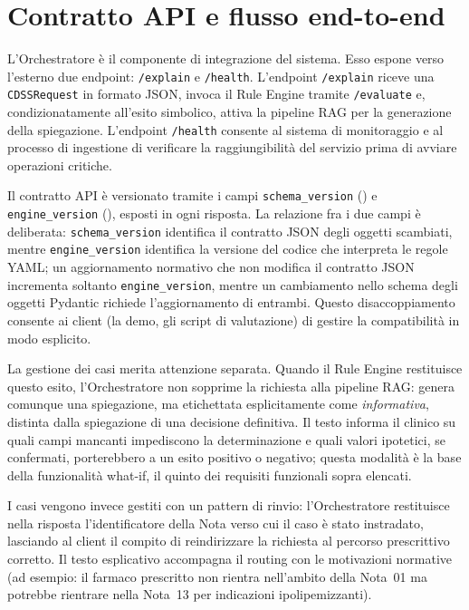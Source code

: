 \section{Contratto API e flusso end-to-end}
\label{sec:orchestrazione}

L'Orchestratore è il componente di integrazione del sistema.
Esso espone verso l'esterno due endpoint: \texttt{/explain} e \texttt{/health}.
L'endpoint \texttt{/explain} riceve una \texttt{CDSSRequest} in formato JSON,
invoca il Rule Engine tramite \texttt{/evaluate} e, condizionatamente
all'esito simbolico, attiva la pipeline RAG per la generazione della
spiegazione.
L'endpoint \texttt{/health} consente al sistema di monitoraggio e al
processo di ingestione di verificare la raggiungibilità del servizio
prima di avviare operazioni critiche.

Il contratto API è versionato tramite i campi \texttt{schema\_version}
(\schemaversion) e \texttt{engine\_version} (\engineversion), esposti
in ogni risposta.
La relazione fra i due campi è deliberata: \texttt{schema\_version}
identifica il contratto JSON degli oggetti scambiati, mentre
\texttt{engine\_version} identifica la versione del codice che interpreta
le regole YAML; un aggiornamento normativo che non modifica il contratto
JSON incrementa soltanto \texttt{engine\_version}, mentre un cambiamento
nello schema degli oggetti Pydantic richiede l'aggiornamento di entrambi.
Questo disaccoppiamento consente ai client (la demo, gli script di valutazione)
di gestire la compatibilità in modo esplicito.

La gestione dei casi  merita attenzione separata.
Quando il Rule Engine restituisce questo esito, l'Orchestratore non sopprime
la richiesta alla pipeline RAG: genera comunque una spiegazione, ma
etichettata esplicitamente come \emph{informativa}, distinta dalla spiegazione
di una decisione definitiva.
Il testo informa il clinico su quali campi mancanti impediscono la
determinazione e quali valori ipotetici, se confermati, porterebbero
a un esito positivo o negativo; questa modalità è la base della funzionalità
what-if, il quinto dei requisiti funzionali sopra elencati.

I casi  vengono invece gestiti con un pattern di rinvio:
l'Orchestratore restituisce nella risposta l'identificatore della Nota
verso cui il caso è stato instradato, lasciando al client il compito
di reindirizzare la richiesta al percorso prescrittivo corretto.
Il testo esplicativo accompagna il routing con le motivazioni normative
(ad esempio: il farmaco prescritto non rientra nell'ambito della Nota~01
ma potrebbe rientrare nella Nota~13 per indicazioni ipolipemizzanti).

